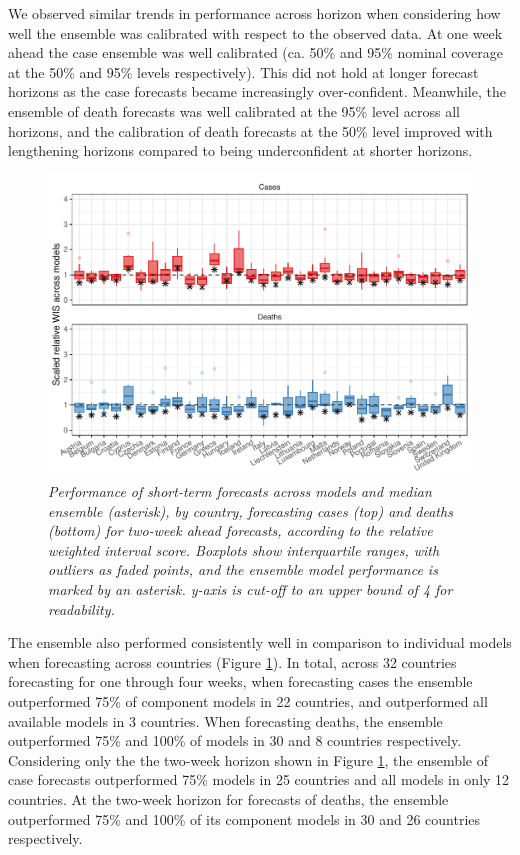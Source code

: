 \documentclass[
]{article}
\begin{document}
We observed similar trends in performance across horizon when considering how well the ensemble was calibrated with respect to the observed data. At one week ahead the case ensemble was well calibrated (ca. 50\% and 95\% nominal coverage at the 50\% and 95\% levels respectively). This did not hold at longer forecast horizons as the case forecasts became increasingly over-confident. Meanwhile, the ensemble of death forecasts was well calibrated at the 95\% level across all horizons, and the calibration of death forecasts at the 50\% level improved with lengthening horizons compared to being underconfident at shorter horizons.

\begin{figure}
\centering
\includegraphics{latest_files/figure-latex/performance-countries-1.pdf}
\caption{\label{fig:performance-countries}\emph{Performance of short-term forecasts across models and
median ensemble (asterisk), by country, forecasting cases (top) and deaths (bottom) for two-week ahead forecasts, according to the relative weighted interval score. Boxplots show interquartile ranges, with outliers as faded points, and the ensemble model performance is marked by an asterisk. y-axis is cut-off to an upper bound of 4 for readability.}}
\end{figure}

The ensemble also performed consistently well in comparison to individual models when forecasting across countries (Figure \ref{fig:performance-countries}). In total, across 32 countries forecasting for one through four weeks, when forecasting cases the ensemble outperformed 75\% of component models in 22 countries, and outperformed all available models in 3 countries. When forecasting deaths, the ensemble outperformed 75\% and 100\% of models in 30 and 8 countries respectively. Considering only the the two-week horizon shown in Figure \ref{fig:performance-countries}, the ensemble of case forecasts outperformed 75\% models in 25 countries and all models in only 12 countries. At the two-week horizon for forecasts of deaths, the ensemble outperformed 75\% and 100\% of its component models in 30 and 26 countries respectively.
\end{document}
